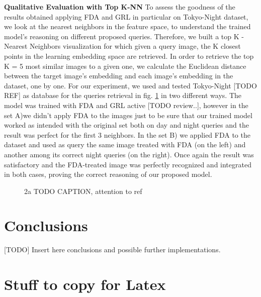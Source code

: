 \documentclass[10pt,twocolumn,letterpaper]{article}
\begin{document}
\textbf{Qualitative Evaluation with Top K-NN}
\newline 
To assess the goodness of the results obtained applying FDA and GRL in particular on Tokyo-Night dataset, we look at the nearest neighbors in the feature space, to understand the trained model's reasoning on different proposed queries. 
Therefore, we built a top K - Nearest Neighbors visualization
for which given a query image, the K closest points in the learning embedding space are retrieved.
In order to retrieve the top K = 5 most similar images to a given one, we calculate the Euclidean distance between the target image's embedding and each image's embedding in the dataset, one by one.
For our experiment, we used and tested Tokyo-Night [TODO REF] as database for the queries retrieval in fig. \ref{fig:tokyonighttopknn} in two different ways.
The model was trained with FDA and GRL active [TODO review..], however in the set A)\newline we didn't apply FDA to the images just to be sure that our trained model worked as intended with the original set both on day and night queries and the result was perfect for the first 3 neighbors.
In the set B) we applied FDA to the dataset and used as query the same image treated with FDA (on the left) and another among its correct night queries (on the right).
Once again the result was satisfactory and the FDA-treated image was perfectly recognized and integrated in both cases, proving the correct reasoning of our proposed model.

\begin{figure*}
  \centering
  \begin{subfigure}{1.0\linewidth}
    \centering
    \caption{2a TODO CAPTION, attention to ref}
    \label{fig:tokyonighttopknn}
  \end{subfigure}
  \hfill
\end{figure*}

\section{Conclusions}
[TODO] Insert here conclusions and possible further implementations.


\section{Stuff to copy for Latex}
\end{document}
